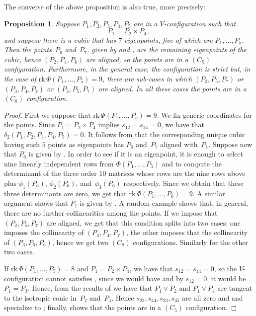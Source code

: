 \documentclass[a4paper, 11pt, reqno]{amsart}
\theoremstyle{plain}
\newtheorem{prop}[lemma]{Proposition}
\theoremstyle{definition}
\newcommand{\rk}{\ensuremath{\mathrm{rk}}}
\begin{document}
%
The converse of the above proposition is also true, more precisely:
\begin{prop}
   Suppose $P_1, P_2, P_3, P_4, P_5$ are in a $V$-configuration such that
%
\[
  P_1 = P_2 \times P_4 \,,
\]
%
and suppose there is a cubic that has $7$ eigenpoints, five of which are $P_1, \dotsc, P_5$. Then the points~$P_6$ and~$P_7$, given by  and , are the remaining eigenpoints of the cubic, hence $(P_2, P_4, P_6)$ are aligned, so the points are in a $(C_5)$ configuration. Furthermore, in the general case, the configuration is 
strict but, in the case of $\rk \, \Phi(P_1, \dotsc, P_5) = 9$, there are sub-cases in which $(P_2, P_5, P_7)$ or $(P_3, P_4, P_7)$ or $(P_3, P_5, P_7)$ are aligned. In all these cases the points are in a $(C_8)$ configuration.
\end{prop}
%
\begin{proof}
First we suppose that $\rk \, \Phi(P_1, \dotsc, P_5) = 9$.
We fix generic coordinates for the points.
Since $P_1 = P_2 \times P_4$ implies $s_{12}=s_{14}=0$,
we have that $\delta_2 (P_1,P_2,P_3,P_4,P_5)=0$. 
It follows from  that the corresponding unique cubic having such $5$ points as eigenpoints has $P_6$ and~$P_7$ aligned with~$P_1$.
Suppose now that $P_6$ is given by .
In order to see if it is an eigenpoint, it is enough to select nine linearly independent rows from $\Phi(P_1, \dotsc, P_5)$
and to compute the determinant of the three order $10$ matrices whose rows are the nine rows above plus $\phi_1(P_6)$, $\phi_2(P_6)$, and~$\phi_3(P_6)$ respectively.
Since we obtain that these three determinants are zero, we get that $\rk \, \Phi(P_1, \dotsc, P_6) = 9$.
A similar argument shows that $P_7$ is given by .
A random example shows that, in general, there are no further collinearities among the points.
If we impose that $(P_2, P_5, P_7)$ are aligned, we get that this condition splits into two cases:
one imposes the collinearity of $(P_3, P_4, P_7)$, the other imposes that the collinearity of $(P_3, P_5, P_6)$,
hence we get two $(C_8)$ configurations. Similarly for the other two cases. 

If $\rk \, \Phi(P_1, \dotsc, P_5) = 8$ and $P_1 = P_2 \times P_4$, we have that $s_{12} = s_{14} = 0$, so the $V$-configuration cannot satisfies , since we would have  and by $s_{12} = 0$, it would be $P_1 = P_3$. Hence,
from the results of  we have that $P_1 \vee P_2$ and $P_1 \vee P_4$ are tangent to the isotropic conic in~$P_2$ and~$P_4$. Hence $s_{22}, s_{44}, s_{23}, s_{45}$ are all zero and  and  specialize to ; finally,  shows that the points are in a $(C_5)$ configuration.
\end{proof}
%
\end{document}
